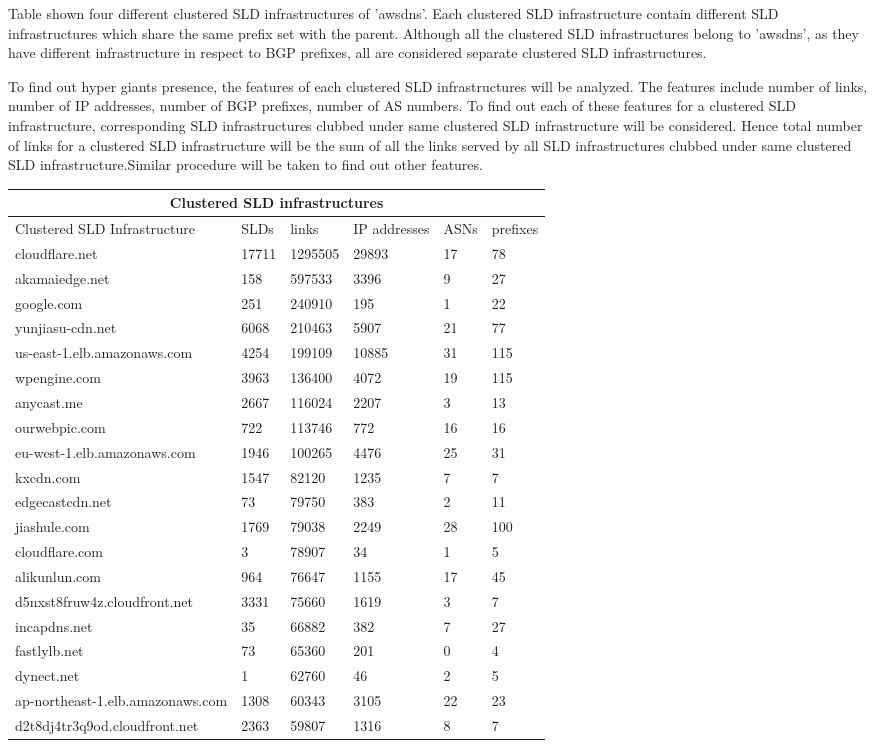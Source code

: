 Table shown four different clustered SLD infrastructures of 'awsdns'. Each clustered SLD infrastructure contain different SLD infrastructures which share the same prefix set with the parent. Although all the clustered SLD infrastructures belong to 'awsdns', as they have different infrastructure in respect to BGP prefixes, all are considered separate clustered SLD infrastructures.

To find out hyper giants presence, the features of each clustered SLD infrastructures will be analyzed. The features include number of links, number of IP addresses, number of BGP prefixes, number of AS numbers. To find out each of these features for a  clustered SLD infrastructure, corresponding SLD infrastructures clubbed under same clustered SLD infrastructure will be considered. Hence total number of links for a clustered SLD infrastructure will be the sum of all the links served by all SLD infrastructures clubbed under same clustered SLD infrastructure.Similar procedure will be taken to find out other features.

\begin{tabular}{ |p{6cm}||p{1cm}||p{1cm}||p{1cm}||p{1cm}||p{1cm}| }
 \hline
 \multicolumn{6}{|c|}{Clustered SLD infrastructures} \\
 \hline
 Clustered SLD Infrastructure    & SLDs & links& IP addresses& ASNs& prefixes\\
 \hline
cloudflare.net& 17711& 1295505& 29893& 17 &78\\
akamaiedge.net& 158& 597533& 3396& 9 &27\\
google.com& 251& 240910& 195& 1&22\\
yunjiasu-cdn.net& 6068& 210463& 5907& 21&77\\
us-east-1.elb.amazonaws.com& 4254& 199109& 10885& 31&115\\
wpengine.com& 3963& 136400& 4072& 19&115\\
anycast.me& 2667& 116024& 2207& 3&13\\
ourwebpic.com& 722& 113746& 772& 16&16\\
eu-west-1.elb.amazonaws.com& 1946& 100265& 4476& 25&31\\
kxcdn.com& 1547& 82120& 1235& 7&7\\
edgecastcdn.net& 73& 79750& 383& 2&11\\
jiashule.com& 1769& 79038& 2249& 28&100\\
cloudflare.com& 3& 78907& 34& 1&5\\
alikunlun.com& 964& 76647& 1155& 17&45\\
d5nxst8fruw4z.cloudfront.net& 3331& 75660& 1619& 3&7\\
incapdns.net& 35& 66882& 382& 7&27\\
fastlylb.net& 73& 65360& 201& 0&4\\
dynect.net& 1& 62760& 46& 2&5\\
ap-northeast-1.elb.amazonaws.com& 1308& 60343& 3105& 22&23\\
d2t8dj4tr3q9od.cloudfront.net& 2363& 59807& 1316& 8&7\\
\hline
\end{tabular}
\newline


